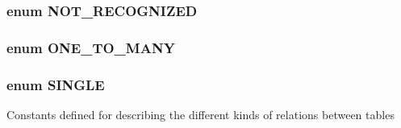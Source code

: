 \subsubsection[{NOT\_\-RECOGNIZED}]{\setlength{\rightskip}{0pt plus 5cm}enum {\bf NOT\_\-RECOGNIZED}}\label{table_8php_a1b965efd4e0428b37a632346f4eef7e1}
\subsubsection[{ONE\_\-TO\_\-MANY}]{\setlength{\rightskip}{0pt plus 5cm}enum {\bf ONE\_\-TO\_\-MANY}}\label{table_8php_ad2a8019952a8ce0c04e4fb3fbb4fe266}
\subsubsection[{SINGLE}]{\setlength{\rightskip}{0pt plus 5cm}enum {\bf SINGLE}}\label{table_8php_a76b06276bbadc1b8d9e716c5d9326919}
Constants defined for describing the different kinds of relations between tables 